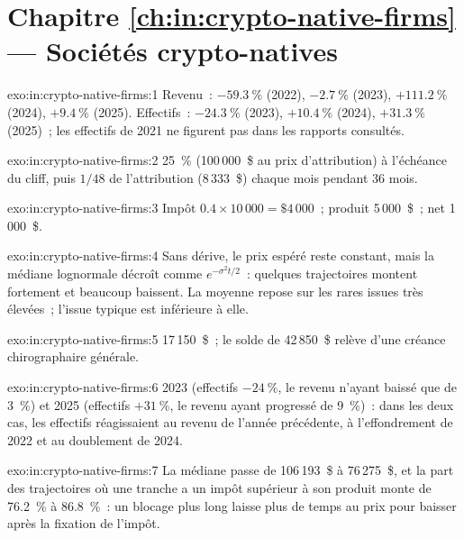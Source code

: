 \section*{Chapitre \ref{ch:in:crypto-native-firms} --- Sociétés crypto-natives}

\begin{solution}{exo:in:crypto-native-firms:1}
Revenu~: $-59.3~\%$ (2022), $-2.7~\%$ (2023), $+111.2~\%$ (2024), $+9.4~\%$ (2025). Effectifs~: $-24.3~\%$ (2023), $+10.4~\%$
(2024), $+31.3~\%$ (2025)~; les effectifs de 2021 ne figurent pas dans les rapports consultés.
\end{solution}

\begin{solution}{exo:in:crypto-native-firms:2}
25~\% (100\,000~\$ au prix d'attribution) à l'échéance du cliff, puis $1/48$ de l'attribution (8\,333~\$) chaque mois pendant 36 mois.
\end{solution}

\begin{solution}{exo:in:crypto-native-firms:3}
Impôt $0.4\times10\,000=\$4\,000$~; produit 5\,000~\$~; net 1\,000~\$.
\end{solution}

\begin{solution}{exo:in:crypto-native-firms:4}
Sans dérive, le prix espéré reste constant, mais la médiane lognormale décroît comme $e^{-\sigma^2t/2}$~: quelques trajectoires montent fortement et beaucoup baissent.
La moyenne repose sur les rares issues très élevées~; l'issue typique est inférieure à elle.
\end{solution}

\begin{solution}{exo:in:crypto-native-firms:5}
17\,150~\$~; le solde de 42\,850~\$ relève d'une créance chirographaire générale.
\end{solution}

\begin{solution}{exo:in:crypto-native-firms:6}
2023 (effectifs $-24~\%$, le revenu n'ayant baissé que de 3~\%) et 2025 (effectifs $+31~\%$, le revenu ayant progressé de 9~\%)~: dans les deux cas, les effectifs
réagissaient au revenu de l'année précédente, à l'effondrement de 2022 et au doublement de 2024.
\end{solution}

\begin{solution}{exo:in:crypto-native-firms:7}
La médiane passe de 106\,193~\$ à 76\,275~\$, et la part des trajectoires où une tranche a un impôt supérieur à son produit monte
de 76.2~\% à 86.8~\%~: un blocage plus long laisse plus de temps au prix pour baisser après la fixation de l'impôt.
\end{solution}

